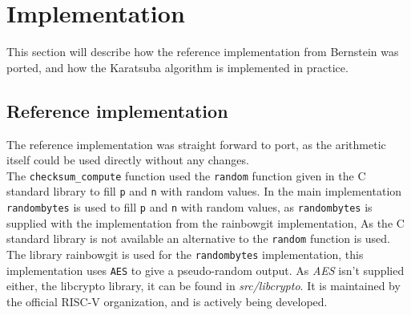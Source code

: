 \section{Implementation}


This section will describe how the reference implementation from Bernstein was ported, and how the Karatsuba algorithm is implemented in practice.
\subsection{Reference implementation}
The reference implementation was straight forward to port, as the arithmetic itself could be used directly without any changes.\medskip
\\
The \texttt{checksum\_compute} function used the \texttt{random\(\)} function given in the C standard library to fill \texttt{p} and \texttt{n} with random values. In the main implementation \texttt{randombytes\(\)} is used to fill \texttt{p} and \texttt{n} with random values, as \texttt{randombytes\(\)} is supplied with the implementation from the rainbowgit implementation\cite{rainbowgit}, 
As the C standard library is not available an alternative to the \texttt{random\(\)} function is used. The library rainbowgit\cite{rainbowgit} is used for the \texttt{randombytes\(\)} implementation, this implementation uses \texttt{AES} to give a pseudo-random output. As \textit{AES} isn't supplied either, the libcrypto library\cite{libcrypto}, it can be found in \textit{src/libcrypto}. It is maintained by the official RISC-V organization, and is actively being developed.

